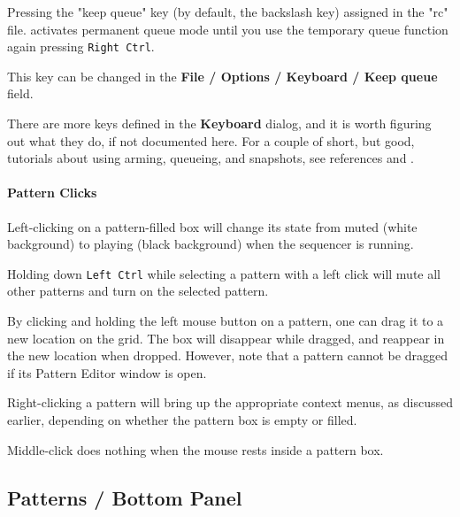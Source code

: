 	Pressing the "keep queue" key (by default, the backslash key)
   assigned in the "rc" file.
	activates permanent queue mode until you use the temporary 
	queue function again pressing \texttt{Right Ctrl}. 

   This key can be changed in the
   \textbf{File / Options / Keyboard / Keep queue} field.

   There are more keys defined in the \textbf{Keyboard} dialog, and it is
   worth figuring out what they do, if not documented here.
   For a couple of short, but good, tutorials about using arming, queueing,
   and snapshots, see references \cite{wootangent1}
   and \cite{wootangent2}.

\paragraph{Pattern Clicks}
\label{paragraph:seq24_patterns_pattern_Clicks}

   Left-clicking on a pattern-filled box will change its state
   from muted (white background) to playing (black background) when
   the sequencer is running.

   Holding down \texttt{Left Ctrl} while selecting a pattern
   with a left click will mute all other patterns and turn on the selected
   pattern.

   By clicking and holding the left mouse button on a pattern,
   one can drag it to a new location on the grid.  The box
   will disappear while dragged, and reappear in the new location when
   dropped.  However, note that a pattern cannot be dragged if its
   Pattern Editor window is open.

   Right-clicking a pattern will bring up the appropriate context menus, as
   discussed earlier, depending on whether the pattern box is empty or
   filled.

   Middle-click does nothing when the mouse rests inside a pattern box.

\subsection{Patterns / Bottom Panel}
\label{subsec:seq24_patterns_panel_bottom}


